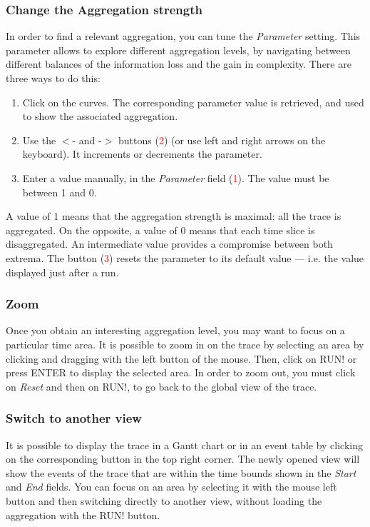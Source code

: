 \documentclass[twoside]{article}
\begin{document}
\begin{sloppypar}
\subsubsection{Change the Aggregation strength}
In order to find a relevant aggregation, you can tune the \textit{Parameter} setting. This parameter allows to explore different aggregation levels, by navigating between different balances of the information loss and the gain in complexity. There are three ways to do this:
\begin{enumerate}
	\item Click on the curves. The corresponding parameter value is retrieved, and used to show the associated aggregation.
	\item Use the $<$- and -$>$ buttons (\textcolor{red}{2}) (or use left and right arrows on the keyboard). It increments or decrements the parameter.
	\item Enter a value manually, in the \textit{Parameter} field (\textcolor{red}{1}). The value must be between 1 and 0.
\end{enumerate}
A value of 1 means that the aggregation strength is maximal: all the trace is aggregated. On the opposite, a value of 0 means that each time slice is disaggregated. An intermediate value provides a compromise between both extrema. The button (\textcolor{red}{3}) resets the parameter to its default value --- i.e. the value displayed just after a run.

\subsubsection{Zoom}
Once you obtain an interesting aggregation level, you may want to focus on a particular time area. It is possible to zoom in on the trace by selecting an area by clicking and dragging with the left button of the mouse. Then, click on RUN! or press ENTER to display the selected area. In order to zoom out, you must click on \textit{Reset} and then on RUN!, to go back to the global view of the trace.

\subsubsection{Switch to another view}
It is possible to display the trace in a Gantt chart or in an event table by clicking on the corresponding button in the top right corner. The newly opened view will show the events of the trace that are within the time bounds shown in the \textit{Start} and \textit{End} fields. You can focus on an area by selecting it with the mouse left button and then switching directly to another view, without loading the aggregation with the RUN! button. 


\end{sloppypar}
\end{document}
